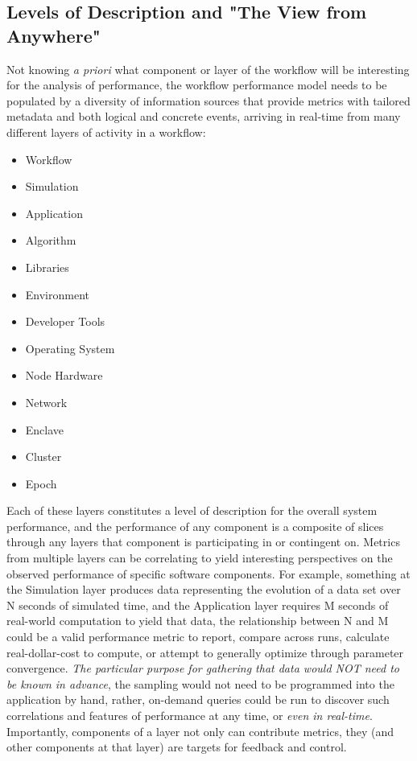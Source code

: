 \subsection{Levels of Description and "The View from Anywhere"}
Not knowing \textit{a priori} what component or layer of the workflow
will be interesting for the analysis of performance, the workflow
performance model needs to be populated by a diversity of information
sources that provide metrics with tailored metadata and both logical
and concrete events, arriving in real-time from many different layers
of activity in a workflow:
\begin{itemize}
    \item Workflow
    \item Simulation
    \item Application
    \item Algorithm
    \item Libraries
    \item Environment
    \item Developer Tools
    \item Operating System
    \item Node Hardware
    \item Network
    \item Enclave
    \item Cluster
    \item Epoch	
\end{itemize}

Each of these layers constitutes a level of description for the
overall system performance, and the performance of any component is a
composite of slices through any layers that component is participating
in or contingent on. Metrics from multiple layers can be correlating
to yield interesting perspectives on the observed performance of
specific software components.  For example, something at the
Simulation layer produces data representing the evolution of a data
set over N seconds of simulated time, and the Application layer
requires M seconds of real-world computation to yield that data, the
relationship between N and M could be a valid performance metric to
report, compare across runs, calculate real-dollar-cost to compute, or
attempt to generally optimize through parameter convergence. \textit{The
particular purpose for gathering that data would NOT need to be known
in advance}, the sampling would not need to be programmed into the
application by hand, rather, on-demand queries could be run to
discover such correlations and features of performance at any time, or
\textit{even in real-time}. Importantly, components of a layer not
only can contribute metrics, they (and other components at that layer)
are targets for feedback and control.

